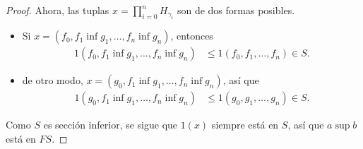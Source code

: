 \begin{proof}
  Ahora, las tuplas $x=\prod_{i=0}^n H_{\gamma_i}$ son de
  dos formas posibles.
  \begin{itemize}
    \item Si $x=(f_0,f_1\inf g_1,\dots,f_n\inf g_n)$,
    entonces
    \begin{align*}
      1(f_0,f_1\inf g_1,\dots,f_n\inf g_n)
      &\leq 1(f_0,f_1,\dots,f_n) \in S.
    \end{align*}
    \item de otro modo, $x=(g_0,f_1\inf g_1,\dots,f_n\inf g_n)$,
    así que
    \begin{align*}
      1(g_0,f_1\inf g_1,\dots,f_n\inf g_n)
      &\leq 1(g_0,g_1,\dots,g_n)\in S.
    \end{align*}
  \end{itemize}
  Como $S$ es sección inferior, se sigue que $1(x)$ siempre está en
  $S$, así que $a\sup b$ está en $FS$.
\end{proof}

